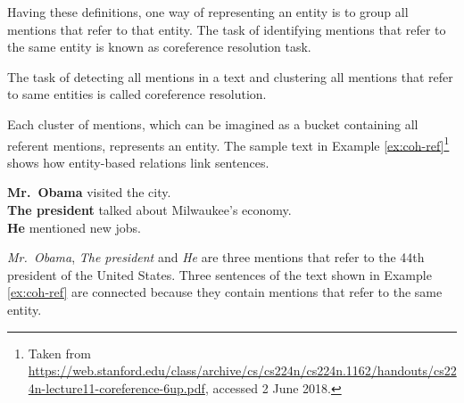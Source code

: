 Having these definitions, one way of representing an entity is to group all mentions that refer to that entity. 
The task of identifying mentions that refer to the same entity is known as coreference resolution task.  

\begin{definition}
	The task of detecting all mentions in a text and clustering all mentions that refer to same entities is called coreference resolution. 
\end{definition}

Each cluster of mentions, which can be imagined as a bucket containing all referent mentions, represents an entity. 
The sample text in Example \ref{ex:coh-ref}\footnote{Taken from \url{https://web.stanford.edu/class/archive/cs/cs224n/cs224n.1162/handouts/cs224n-lecture11-coreference-6up.pdf}, accessed 2 June 2018.} shows how entity-based relations link sentences. 

\begin{examples}
	\label{ex:coh-ref}
	\textbf{Mr.\ Obama} visited the city. \\
	\textbf{The president} talked about Milwaukee’s economy. \\
	\textbf{He} mentioned new jobs. \\
\end{examples} 

\emph{Mr.\ Obama}, \emph{The president} and \emph{He} are three mentions that refer to the 44th president of the United States. 
Three sentences of the text shown in Example \ref{ex:coh-ref} are connected because they contain mentions that refer to the same entity. 

